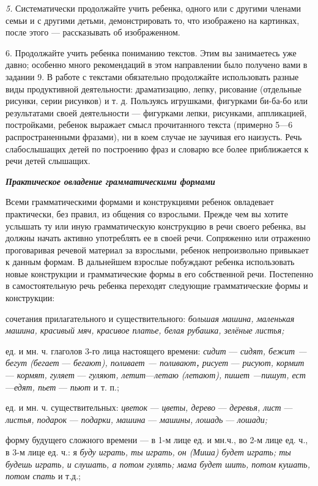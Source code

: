 \documentclass[a5paper]{book}
\renewcommand{\emph}[1]{\textit{#1}}
\begin{document}
\emph{5.} Систематически продолжайте учить ребенка, одного или с другими
членами семьи и с другими детьми, демонстрировать то, что изображено на
картинках, после этого --- рассказывать об изображенном.

6. Продолжайте учить ребенка пониманию текстов. Этим вы занимаетесь уже
давно; особенно много рекомендаций в этом направлении было получено вами
в задании 9. В работе с текстами обязательно продолжайте использовать
разные виды продуктивной деятельности: драматизацию, лепку, рисование
(отдельные рисунки, серии рисунков) и т. д. Пользуясь игрушками,
фигурками би-ба-бо или результатами своей деятельности --- фигурками
лепки, рисунками, аппликацией, постройками, ребенок выражает смысл
прочитанного текста (примерно 5---6 распространенными фразами), ни в
коем случае не заучивая его наизусть. Речь слабослышащих детей по
построению фраз и словарю все более приближается к речи детей слышащих.

\emph{\textbf{Практическое овладение грамматическими формами}}

Всеми грамматическими формами и конструкциями ребенок овладевает
практически, без правил, из общения со взрослыми. Прежде чем вы хотите
услышать ту или иную грамматическую конструкцию в речи своего ребенка,
вы должны начать активно употреблять ее в своей речи. Сопряженно или
отраженно проговаривая речевой материал за взрослыми, ребенок
непроизвольно привыкает к данным формам. В дальнейшем взрослые побуждают
ребенка использовать новые конструкции и грамматические формы в его
собственной речи. Постепенно в самостоятельную речь ребенка переходят
следующие грамматические формы и конструкции:

сочетания прилагательного и существительного: \emph{большая машина,
маленькая машина, красивый мяч, красивое платье, белая рубашка, зелёные
листья;}

ед. и мн. ч. глаголов 3-го лица настоящего времени: \emph{сидит} ---
\emph{сидят, бежит ---бегут (бегает} --- \emph{бегают), поливает ---
поливают\textbf{,} рисует} --- \emph{рисуют, кормит} --- \emph{кормят,
гуляет} --- \emph{гуляют, летит}---\emph{летаю (летают), пишет ---пишут,
ест}---\emph{едят, пьет} --- \emph{пьют} и т. п.;

ед. и мн. ч. существительных: \emph{цветок} --- \emph{цветы, дерево} ---
\emph{деревья, лист} --- \emph{листья, подарок} --- \emph{подарки,
машина} --- \emph{машины, лошадь} --- \emph{лошади;}

форму будущего сложного времени --- в 1-м лице ед. и мн.ч., во 2-м лице
ед. ч., в 3-м лице ед. ч.: я \emph{буду играть, ты играть, он (Миша)
будет играть; ты будешь играть, и слушать, а потом гулять; мама будет
шить, потом кушать, потом спать} и т.д.;
\end{document}

